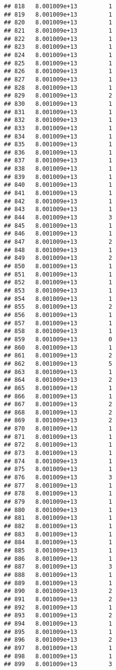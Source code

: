 \documentclass[
]{article}
\begin{document}
\begin{verbatim}
## 818   8.001009e+13         1
## 819   8.001009e+13         1
## 820   8.001009e+13         1
## 821   8.001009e+13         1
## 822   8.001009e+13         1
## 823   8.001009e+13         1
## 824   8.001009e+13         1
## 825   8.001009e+13         1
## 826   8.001009e+13         1
## 827   8.001009e+13         1
## 828   8.001009e+13         1
## 829   8.001009e+13         2
## 830   8.001009e+13         1
## 831   8.001009e+13         1
## 832   8.001009e+13         1
## 833   8.001009e+13         1
## 834   8.001009e+13         1
## 835   8.001009e+13         1
## 836   8.001009e+13         1
## 837   8.001009e+13         1
## 838   8.001009e+13         1
## 839   8.001009e+13         1
## 840   8.001009e+13         1
## 841   8.001009e+13         1
## 842   8.001009e+13         1
## 843   8.001009e+13         1
## 844   8.001009e+13         3
## 845   8.001009e+13         1
## 846   8.001009e+13         1
## 847   8.001009e+13         2
## 848   8.001009e+13         1
## 849   8.001009e+13         2
## 850   8.001009e+13         1
## 851   8.001009e+13         1
## 852   8.001009e+13         1
## 853   8.001009e+13         1
## 854   8.001009e+13         1
## 855   8.001009e+13         2
## 856   8.001009e+13         1
## 857   8.001009e+13         1
## 858   8.001009e+13         1
## 859   8.001009e+13         0
## 860   8.001009e+13         1
## 861   8.001009e+13         2
## 862   8.001009e+13         5
## 863   8.001009e+13         1
## 864   8.001009e+13         2
## 865   8.001009e+13         1
## 866   8.001009e+13         1
## 867   8.001009e+13         2
## 868   8.001009e+13         2
## 869   8.001009e+13         2
## 870   8.001009e+13         1
## 871   8.001009e+13         1
## 872   8.001009e+13         1
## 873   8.001009e+13         1
## 874   8.001009e+13         1
## 875   8.001009e+13         1
## 876   8.001009e+13         3
## 877   8.001009e+13         1
## 878   8.001009e+13         1
## 879   8.001009e+13         1
## 880   8.001009e+13         1
## 881   8.001009e+13         1
## 882   8.001009e+13         1
## 883   8.001009e+13         1
## 884   8.001009e+13         1
## 885   8.001009e+13         1
## 886   8.001009e+13         1
## 887   8.001009e+13         3
## 888   8.001009e+13         1
## 889   8.001009e+13         1
## 890   8.001009e+13         2
## 891   8.001009e+13         2
## 892   8.001009e+13         1
## 893   8.001009e+13         2
## 894   8.001009e+13         1
## 895   8.001009e+13         1
## 896   8.001009e+13         2
## 897   8.001009e+13         1
## 898   8.001009e+13         1
## 899   8.001009e+13         3

\end{verbatim}
\end{document}
